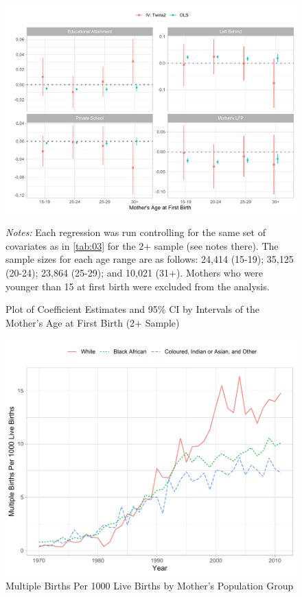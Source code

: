 \documentclass[11pt,a4paper]{article}
\newcommand\fnote[1]{\captionsetup{font=footnotesize}\caption*{#1}}
\begin{document}
\begin{figure}[h!]
\centering
\caption{\label{fig:05}Plot of Coefficient Estimates and 95\% CI by Intervals of the Mother's Age at First Birth (2$ + $ Sample)}
\includegraphics[width=\textwidth]{figures/age_mods.pdf}
\fnote{\textit{Notes:} Each regression was run controlling for the same set of covariates as in \autoref{tab:03} for the 2+ sample (see notes there). The sample sizes for each age range are as follows: 24,414 (15-19); 35,125 (20-24); 23,864 (25-29); and 10,021 (31+). Mothers who were younger than 15 at first birth were excluded from the analysis.}
\end{figure}

\begin{figure}[h!]
\centering
\caption{\label{fig:04}Multiple Births Per 1000 Live Births by Mother's Population Group}
\includegraphics[width=\textwidth]{figures/line_pp.pdf}
\end{figure}
\end{document}
